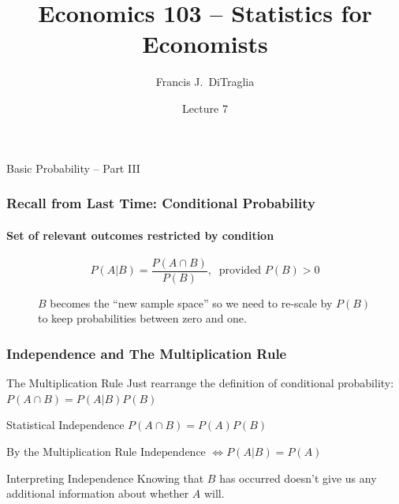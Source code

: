 \documentclass[handout]{beamer}
\title[Econ 103]{Economics 103 -- Statistics for Economists}
\author[F. DiTraglia]{Francis J.\ DiTraglia}
\institute{University of Pennsylvania}
\date{Lecture 7}
\begin{document}
 





\begin{frame}[plain]
	\titlepage 
	

\end{frame} 

\begin{frame}
\begin{center}
 \Huge Basic Probability -- Part III
\end{center}

\end{frame}


\def\EventA{(-0.35,0) circle (1.2)}
\def\EventB{(1.35,0) circle (1.2)}
\def\EventC{(-0.35,0) circle (0.6)}
\def\EventD{(0,0) circle (1.6)}
\def\SampleSpace{(-2,-2) rectangle (3,2)}

\begin{frame}
\frametitle{Recall from Last Time: Conditional Probability}
\framesubtitle{Set of relevant outcomes restricted by condition}
$$P(A|B) = \frac{P(A\cap B)}{P(B)},\;\; \mbox{provided } P(B)>0$$
\begin{figure}
\centering
{}
\caption{$B$ becomes the ``new sample space'' so we need to re-scale by $P(B)$ to keep probabilities between zero and one.}
\end{figure}
\end{frame}

\begin{frame}
\frametitle{Independence and The Multiplication Rule}
\begin{block}{The Multiplication Rule}
Just rearrange the definition of conditional probability:
$P(A\cap B) = P(A|B)P(B)$
\end{block}\pause
\begin{block}{Statistical Independence}
$P(A\cap B) = P(A)P(B)$
\end{block}\pause
\begin{alertblock}{By the Multiplication Rule}
$\mbox{Independence } \iff P(A|B) = P(A)$\\
\end{alertblock}\pause
\begin{block}{Interpreting Independence}
Knowing that $B$ has occurred doesn't give us any additional information about whether $A$ will.
\end{block}
\end{frame}
\end{document}
